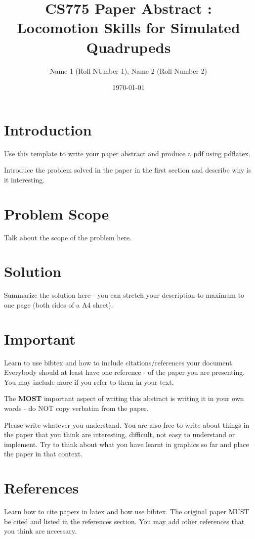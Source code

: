 \documentclass[a4paper,11pt,twocolumn]{article}
\title{CS775 Paper Abstract : Locomotion Skills for Simulated Quadrupeds}
\author{Name 1 (Roll NUmber 1), Name 2 (Roll Number 2)}
\date{\today}
\begin{document}
\maketitle

\section{Introduction}
Use this template to write your paper abstract and produce a pdf using
pdflatex.

Introduce the problem solved in the paper in the first section and
describe why is it interesting.

\section{Problem Scope}
Talk about the scope of the problem here.

\section{Solution}
Summarize the solution here - you can stretch your description to
maximum to one page (both sides of a A4 sheet).

\section{Important}
Learn to use bibtex and how to include citations/references your
document. Everybody should at least have one reference - of the paper
you are presenting. You may include more if you refer to them in your
text.

The \textbf{MOST} important aspect of writing this abstract is writing
it in your own words - do NOT copy verbatim from the paper. 

Please write whatever you understand. You are also free to write about
things in the paper that you think are interesting, difficult, not
easy to understand or implement. Try to think about what you have
learnt in graphics so far and place the paper in that context.

\section{References}
Learn how to cite papers in latex and how use bibtex. The original paper MUST be cited and listed in the references section. You may add other references that you think are necessary.
\end{document}
